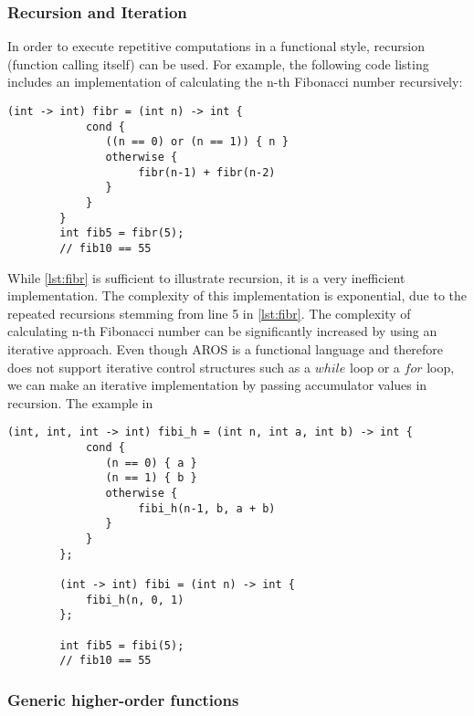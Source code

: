 \subsubsection{Recursion and Iteration}
In order to execute repetitive computations in a functional style, recursion (function calling itself) can be used. For example, the following code listing includes an implementation of calculating the n-th Fibonacci number recursively:
    \begin{lstlisting}[language=aros, label=lst:fibr, caption= Recursive implementation of calculating n-th Fibonacci number]
        (int -> int) fibr = (int n) -> int {
            cond {
               ((n == 0) or (n == 1)) { n } 
               otherwise { 
                    fibr(n-1) + fibr(n-2)
               }
            }
        }
        int fib5 = fibr(5);
        // fib10 == 55
    \end{lstlisting}

\par{} While \cref{lst:fibr} is sufficient to illustrate recursion, it is a very inefficient implementation. The complexity of this implementation is exponential, due to the repeated recursions stemming from line 5 in \cref{lst:fibr}. The complexity of calculating n-th Fibonacci number can be significantly increased by using an iterative approach. Even though AROS is a functional language and therefore does not support iterative control structures such as a $while$ loop or a $for$ loop, we can make an iterative implementation by passing accumulator values in recursion. The example in 

\newblock

    \begin{lstlisting}[language=aros, label={lst:fibi}, caption= Iterative implementation of calculating n-th Fibonacci number]
        (int, int, int -> int) fibi_h = (int n, int a, int b) -> int {
            cond {
               (n == 0) { a } 
               (n == 1) { b }
               otherwise { 
                    fibi_h(n-1, b, a + b)
               }
            }
        };
        
        (int -> int) fibi = (int n) -> int {
            fibi_h(n, 0, 1)
        };
        
        int fib5 = fibi(5);
        // fib10 == 55
    \end{lstlisting}

\subsubsection{Generic higher-order functions}

